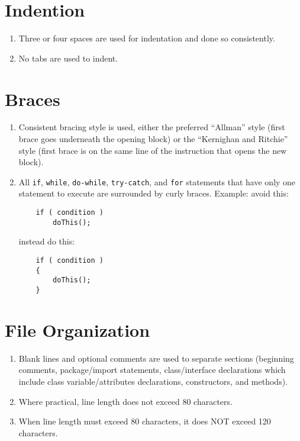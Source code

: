 \section{Indention}\begin{enumerate}[resume]
\item \label{item:8}Three or four spaces are used for indentation and done so consistently.
\item \label{item:9}No tabs are used to indent.
\end{enumerate}

\section{Braces}\begin{enumerate}[resume]
\item \label{item:10}Consistent bracing style is used, either the preferred ``Allman'' style (first brace goes underneath the opening block) or the ``Kernighan and Ritchie'' style (first brace is on the same line of the instruction that opens the new block).
\item \label{item:11}All \texttt{if}, \texttt{while}, \texttt{do-while}, \texttt{try-catch}, and \texttt{for} statements that have only one statement to execute are surrounded by curly braces. Example:
avoid this:

\begin{verbatim}
	if ( condition )
		doThis();
\end{verbatim}

instead do this:

\begin{verbatim}
	if ( condition ) 
	{
		doThis(); 
	}
\end{verbatim}

\end{enumerate}

\section{File Organization}\begin{enumerate}[resume]
\item \label{item:12}Blank lines and optional comments are used to separate sections (beginning comments, package/import statements, class/interface declarations which include class variable/attributes declarations, constructors, and methods).
\item \label{item:13}Where practical, line length does not exceed 80 characters.
\item \label{item:14}When line length must exceed 80 characters, it does NOT exceed 120 characters.
\end{enumerate}

